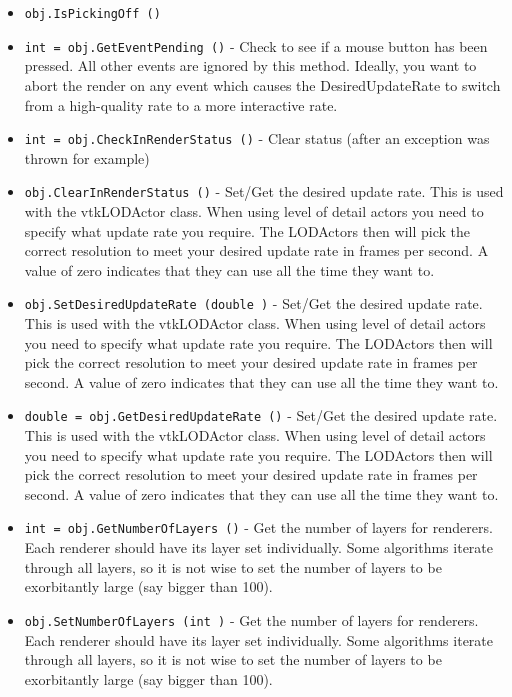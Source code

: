 \begin{itemize}
\item  \verb|obj.IsPickingOff ()|

\item  \verb|int = obj.GetEventPending ()| -  Check to see if a mouse button has been pressed.  All other events
 are ignored by this method.  Ideally, you want to abort the render
 on any event which causes the DesiredUpdateRate to switch from
 a high-quality rate to a more interactive rate.

\item  \verb|int = obj.CheckInRenderStatus ()| -  Clear status (after an exception was thrown for example)

\item  \verb|obj.ClearInRenderStatus ()| -  Set/Get the desired update rate. This is used with
 the vtkLODActor class. When using level of detail actors you
 need to specify what update rate you require. The LODActors then
 will pick the correct resolution to meet your desired update rate
 in frames per second. A value of zero indicates that they can use
 all the time they want to.

\item  \verb|obj.SetDesiredUpdateRate (double )| -  Set/Get the desired update rate. This is used with
 the vtkLODActor class. When using level of detail actors you
 need to specify what update rate you require. The LODActors then
 will pick the correct resolution to meet your desired update rate
 in frames per second. A value of zero indicates that they can use
 all the time they want to.

\item  \verb|double = obj.GetDesiredUpdateRate ()| -  Set/Get the desired update rate. This is used with
 the vtkLODActor class. When using level of detail actors you
 need to specify what update rate you require. The LODActors then
 will pick the correct resolution to meet your desired update rate
 in frames per second. A value of zero indicates that they can use
 all the time they want to.

\item  \verb|int = obj.GetNumberOfLayers ()| -  Get the number of layers for renderers.  Each renderer should have
 its layer set individually.  Some algorithms iterate through all layers,
 so it is not wise to set the number of layers to be exorbitantly large
 (say bigger than 100).

\item  \verb|obj.SetNumberOfLayers (int )| -  Get the number of layers for renderers.  Each renderer should have
 its layer set individually.  Some algorithms iterate through all layers,
 so it is not wise to set the number of layers to be exorbitantly large
 (say bigger than 100).


\end{itemize}
